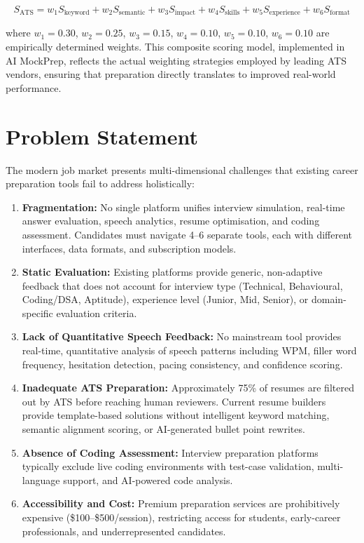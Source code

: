 \documentclass[12pt,a4paper,oneside]{report}
\begin{document}
\begin{equation}
S_{\text{ATS}} = w_1 S_{\text{keyword}} + w_2 S_{\text{semantic}} + w_3 S_{\text{impact}} + w_4 S_{\text{skills}} + w_5 S_{\text{experience}} + w_6 S_{\text{format}}
\label{eq:ats_score}
\end{equation}

\noindent where $w_1 = 0.30$, $w_2 = 0.25$, $w_3 = 0.15$, $w_4 = 0.10$, $w_5 = 0.10$, $w_6 = 0.10$ are empirically determined weights. This composite scoring model, implemented in AI MockPrep, reflects the actual weighting strategies employed by leading ATS vendors, ensuring that preparation directly translates to improved real-world performance.


\section{Problem Statement}
\label{sec:problem_statement}

The modern job market presents multi-dimensional challenges that existing career preparation tools fail to address holistically:

\begin{enumerate}
  \item \textbf{Fragmentation:} No single platform unifies interview simulation, real-time answer evaluation, speech analytics, resume optimisation, and coding assessment. Candidates must navigate 4--6 separate tools, each with different interfaces, data formats, and subscription models.

  \item \textbf{Static Evaluation:} Existing platforms provide generic, non-adaptive feedback that does not account for interview type (Technical, Behavioural, Coding/DSA, Aptitude), experience level (Junior, Mid, Senior), or domain-specific evaluation criteria.

  \item \textbf{Lack of Quantitative Speech Feedback:} No mainstream tool provides real-time, quantitative analysis of speech patterns including WPM, filler word frequency, hesitation detection, pacing consistency, and confidence scoring.

  \item \textbf{Inadequate ATS Preparation:} Approximately 75\% of resumes are filtered out by ATS before reaching human reviewers. Current resume builders provide template-based solutions without intelligent keyword matching, semantic alignment scoring, or AI-generated bullet point rewrites.

  \item \textbf{Absence of Coding Assessment:} Interview preparation platforms typically exclude live coding environments with test-case validation, multi-language support, and AI-powered code analysis.

  \item \textbf{Accessibility and Cost:} Premium preparation services are prohibitively expensive (\$100--\$500/session), restricting access for students, early-career professionals, and underrepresented candidates.
\end{enumerate}
\end{document}
